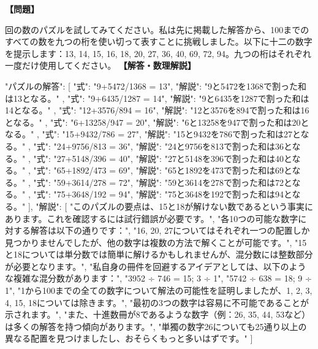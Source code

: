 \documentclass[10pt,a4paper,oneside,openany]{ltjsbook}
\begin{document}
\begin{tcolorbox}[colback=softblue,colframe=primaryblue,title=\textbf{第 91 問：MORE MIXED FRACTIONS.},arc=2mm,boxrule=1pt,breakable]
\textbf{【問題】}\par\vspace{0.3em}
回の数のパズルを試してみてください。私は先に掲載した解答から、100までのすべての数を九つの桁を使い切って表すことに挑戦しました。以下に十二の数字を提示します：13, 14, 15, 16, 18, 20, 27, 36, 40, 69, 72, 94。九つの桁はそれぞれ一度だけ使用してください。
\tcblower
\textbf{【解答・数理解説】}\par\vspace{0.3em}
{
    "パズルの解答": [
        {
            "式": "9+5472/1368 = 13",
            "解説": "9と5472を1368で割った和は13となる。"
        },
        {
            "式": "9+6435/1287 = 14",
            "解説": "9と6435を1287で割った和は14となる。"
        },
        {
            "式": "12+3576/894 = 16",
            "解説": "12と3576を894で割った和は16となる。"
        },
        {
            "式": "6+13258/947 = 20",
            "解説": "6と13258を947で割った和は20となる。"
        },
        {
            "式": "15+9432/786 = 27",
            "解説": "15と9432を786で割った和は27となる。"
        },
        {
            "式": "24+9756/813 = 36",
            "解説": "24と9756を813で割った和は36となる。"
        },
        {
            "式": "27+5148/396 = 40",
            "解説": "27と5148を396で割った和は40となる。"
        },
        {
            "式": "65+1892/473 = 69",
            "解説": "65と1892を473で割った和は69となる。"
        },
        {
            "式": "59+3614/278 = 72",
            "解説": "59と3614を278で割った和は72となる。"
        },
        {
            "式": "75+3648/192 = 94",
            "解説": "75と3648を192で割った和は94となる。"
        }
    ],
    "解説": [
        "このパズルの要点は、15と18が解けない数であるという事実にあります。これを確認するには試行錯誤が必要です。",
        "各10つの可能な数字に対する解答は以下の通りです：",
        "16, 20, 27についてはそれぞれ一つの配置しか見つかりませんでしたが、他の数字は複数の方法で解くことが可能です。",
        "15と18については単分数では簡単に解けるかもしれませんが、混分数には整数部分が必要となります。",
        "私自身の冊件を回避するアイデアとしては、以下のような複雑な混分数があります：",
        "3952 ÷ 746 = 15; 3 ÷ 1",
        "5742 ÷ 638 = 18; 9 ÷ 1",
        "1から100までの全ての数字について解法の可能性を証明しましたが、1, 2, 3, 4, 15, 18については除きます。",
        "最初の3つの数字は容易に不可能であることが示されます。",
        "また、十進数冊が8であるような数字（例：26, 35, 44, 53など）は多くの解答を持つ傾向があります。",
        "単獨の数字26についても25通り以上の異なる配置を見つけましたし、おそらくもっと多いはずです。"
    ]
}
\end{tcolorbox}
\end{document}
